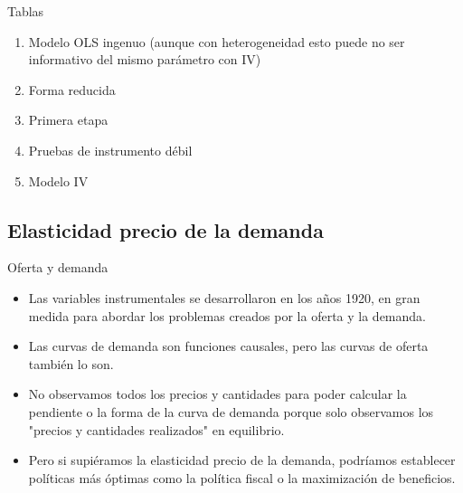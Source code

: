 \documentclass{beamer}
\begin{document}
\begin{frame}{Tablas}

\begin{enumerate}
\item Modelo OLS ingenuo (aunque con heterogeneidad esto puede no ser informativo del mismo parámetro con IV)
\item Forma reducida
\item Primera etapa
\item Pruebas de instrumento débil
\item Modelo IV
\end{enumerate}

\end{frame}








\subsection{Elasticidad precio de la demanda}

\begin{frame}{Oferta y demanda}

\begin{itemize}
\item Las variables instrumentales se desarrollaron en los años 1920, en gran medida para abordar los problemas creados por la oferta y la demanda.
\item Las curvas de demanda son funciones causales, pero las curvas de oferta también lo son.
\item No observamos todos los precios y cantidades para poder calcular la pendiente o la forma de la curva de demanda porque solo observamos los "precios y cantidades realizados" en equilibrio.
\item Pero si supiéramos la elasticidad precio de la demanda, podríamos establecer políticas más óptimas como la política fiscal o la maximización de beneficios.
\end{itemize}

\end{frame}
\end{document}
